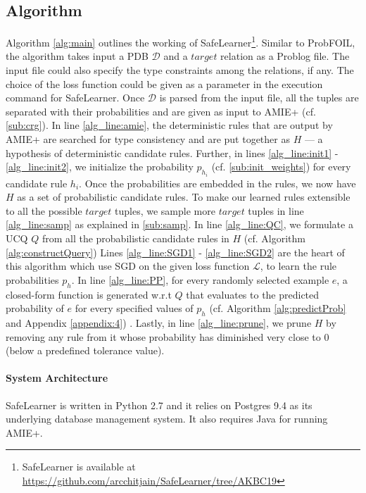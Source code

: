 \documentclass[akbc,twoside,11pt]{article}
\newcounter{example}
\newcommand{\algorithmname}{SafeLearner\xspace}
\begin{document}
\subsection{Algorithm} Algorithm \ref{alg:main} outlines the working of \algorithmname \footnote{\algorithmname is available at \url{https://github.com/arcchitjain/SafeLearner/tree/AKBC19}}. Similar to ProbFOIL, the algorithm takes input a PDB $\mathcal{D}$ and a $target$ relation as a Problog file. The input file could also specify the type constraints among the relations, if any. The choice of the loss function could be given as a parameter in the execution command for \algorithmname. Once $\mathcal{D}$ is parsed from the input file, all the tuples are separated with their probabilities and are given as input to AMIE+ (cf. \ref{sub:crg}). In line \ref{alg_line:amie}, the deterministic rules that are output by AMIE+ are searched for type consistency and are put together as $H$ --- a hypothesis of deterministic candidate rules. Further, in lines \ref{alg_line:init1} - \ref{alg_line:init2}, we initialize the probability $p_{h_i}$ (cf. \ref{sub:init_weights}) for every candidate rule $h_i$. 
Once the probabilities are embedded in the rules, we now have $H$ as a set of probabilistic candidate rules. 
To make our learned rules extensible to all the possible $target$ tuples, we sample more $target$ tuples in line \ref{alg_line:samp} as explained in \ref{sub:samp}. In line \ref{alg_line:QC}, we formulate a UCQ $Q$ from all the probabilistic candidate rules in $H$ (cf. Algorithm \ref{alg:constructQuery})
Lines \ref{alg_line:SGD1} - \ref{alg_line:SGD2} are the heart of this algorithm which use SGD on the given loss function $\mathcal{L}$, to learn the rule probabilities $p_h$. In line \ref{alg_line:PP}, for every randomly selected example $e$, a closed-form function is generated w.r.t $Q$ that evaluates to the predicted probability of $e$ for every specified values of $p_h$ (cf. Algorithm \ref{alg:predictProb} and Appendix \ref{appendix:4}) . Lastly, in line \ref{alg_line:prune}, we prune $H$ by removing any rule from it whose probability has diminished very close to 0 (below a predefined tolerance value).


\paragraph{System Architecture}
\algorithmname is written in Python 2.7 and it relies on Postgres 9.4 as its underlying database management system. It also requires Java for running AMIE+.
\end{document}
